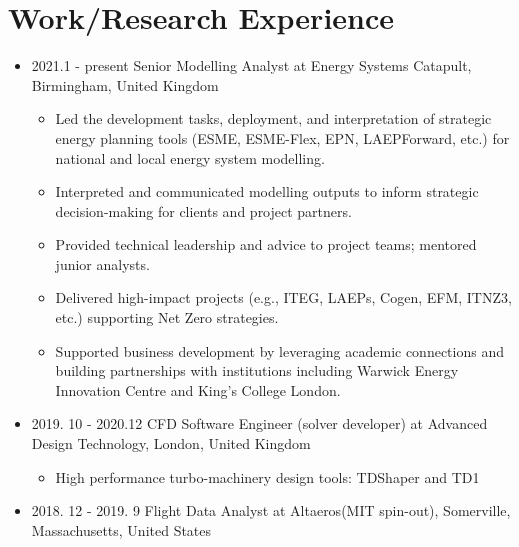 \documentclass[letterpaper]{article}
\begin{document}
\section*{Work/Research Experience}
\begin{itemize}
\item 2021.1 - present \hspace{2pt} Senior Modelling Analyst at Energy Systems Catapult, Birmingham, United Kingdom
  \begin{itemize}
    \item Led the development tasks, deployment, and interpretation of strategic energy planning tools (ESME, ESME-Flex, EPN, LAEPForward, etc.) for national and local energy system modelling.
    \item Interpreted and communicated modelling outputs to inform strategic decision-making for clients and project partners.
    \item Provided technical leadership and advice to project teams; mentored junior analysts.
    \item Delivered high-impact projects (e.g., ITEG, LAEPs, Cogen, EFM, ITNZ3, etc.) supporting Net Zero strategies.
    \item Supported business development by leveraging academic connections and building partnerships with institutions including Warwick Energy Innovation Centre and King's College London.
  \end{itemize}
\item 2019. 10 - 2020.12 \hspace{2pt} CFD Software Engineer (solver developer) at Advanced Design Technology, London, United Kingdom
   \begin{itemize}
   \item High performance turbo-machinery design tools: TDShaper and TD1
   \end{itemize}
\item 2018. 12 - 2019. 9 \hspace{2pt} Flight Data Analyst at Altaeros(MIT spin-out), Somerville, Massachusetts, United States
	

\end{itemize}
\end{document}
